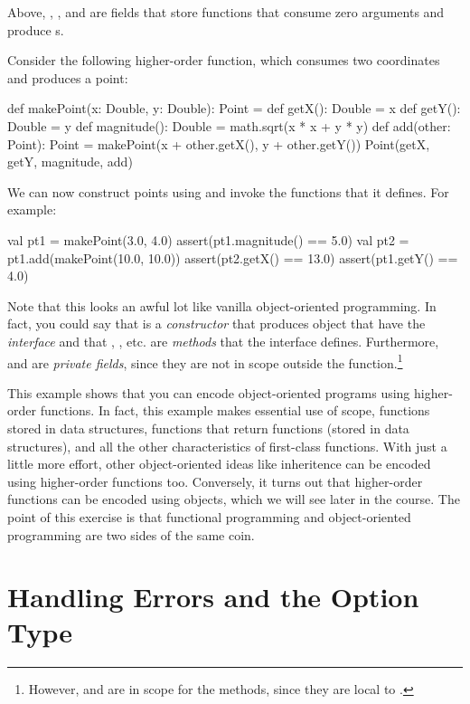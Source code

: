 \documentclass[9pt]{extbook}
\begin{document}
Above, , , and 
are fields that store functions that consume zero arguments and produce
s.

Consider the following higher-order function, which consumes two coordinates
and produces a point:
\begin{scalacode}
def makePoint(x: Double, y: Double): Point = {
  def getX(): Double = x
  def getY(): Double = y
  def magnitude(): Double = math.sqrt(x * x + y * y)
  def add(other: Point): Point = makePoint(x + other.getX(), y + other.getY())
  Point(getX, getY, magnitude, add)
}
\end{scalacode}

We can now construct points using 
and invoke the functions that it defines. For example:
%
\begin{scalacode}
val pt1 = makePoint(3.0, 4.0)
assert(pt1.magnitude() == 5.0)
val pt2 = pt1.add(makePoint(10.0, 10.0))
assert(pt2.getX() == 13.0)
assert(pt1.getY() == 4.0)
\end{scalacode}

Note that this looks an awful lot like vanilla object-oriented programming.
In fact, you could say that  is a \emph{constructor}
that produces object that have the \emph{interface} 
and that , , etc. are \emph{methods} that the
interface defines.
Furthermore,  and  are \emph{private fields},
since they are not in scope outside the 
function.\footnote{However,  and  are in scope
for the methods, since they are local to .}

This example shows that you can encode object-oriented programs using
higher-order functions. In fact, this example makes essential use of
scope, functions stored in data structures, functions that return
functions (stored in data structures), and all the other characteristics
of first-class functions. With just a little more effort, other object-oriented
ideas like inheritence can be encoded using higher-order functions too.
Conversely, it turns out that higher-order functions can be encoded using
objects, which we will see later in the course. The point of this exercise
is that functional programming and object-oriented programming are two sides
of the same coin.



\chapter{Handling Errors and the Option Type}
\end{document}
